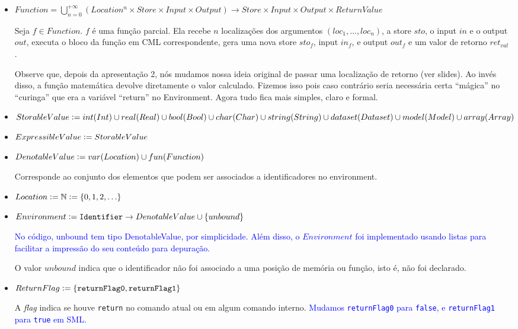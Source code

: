 \documentclass[12pt]{article}
\newcommand{\blu}{\textcolor{blue}}
\newcommand{\defeq}{\vcentcolon=}
\begin{document}
\begin{itemize}
\item $Function = \bigcup_{n = 0}^{+\infty} (Location^n \times Store \times Input \times Output) \rightarrow Store \times Input \times Output \times ReturnValue$

Seja $f\in Function$. $f$ é uma função parcial. Ela recebe $n$ localizações dos argumentos $(loc_1, \ldots, loc_n)$, a store $sto$, o input $in$ e o output $out$, executa o bloco da função em CML correspondente, gera uma nova store $sto_f$, input $in_f$, e output $out_f$ e um valor de retorno $ret_{val}$.

Observe que, depois da apresentação 2, nós mudamos nossa ideia original de passar uma localização de retorno (ver slides). Ao invés disso, a função matemática devolve diretamente o valor calculado. Fizemos isso pois caso contrário seria necessária certa ``mágica'' no ``curinga'' que era a variável ``return'' no Environment. Agora tudo fica mais simples, claro e formal.


\item $StorableValue \defeq int(Int) \cup real(Real) \cup bool(Bool) \cup char(Char) \cup string(String) \cup dataset(Dataset) \cup model(Model) \cup array(Array)$

\item $ExpressibleValue \defeq StorableValue$

\item $DenotableValue \defeq var(Location) \cup fun(Function)$

Corresponde ao conjunto dos elementos que podem ser associados a identificadores no environment.

\item $Location \defeq \mathbb{N} \defeq \{0, 1, 2, \ldots\}$
\item $Environment \defeq {\tt Identifier} \to DenotableValue \cup \{unbound\}$

\blu{No código, unbound tem tipo DenotableValue, por simplicidade. Além disso, o $Environment$ foi implementado usando listas para facilitar a impressão do seu conteúdo para depuração.}

O valor $unbound$ indica que o identificador não foi associado a uma posição de memória ou função, isto é, não foi declarado.

\item $ReturnFlag \defeq {\tt \{returnFlag0, returnFlag1\}}$

A {\it flag} indica se houve {\tt return} no comando atual ou em algum comando interno. \blu{Mudamos \texttt{returnFlag0} para \texttt{false}, e \texttt{returnFlag1} para \texttt{true} em SML.}


\end{itemize}
\end{document}
